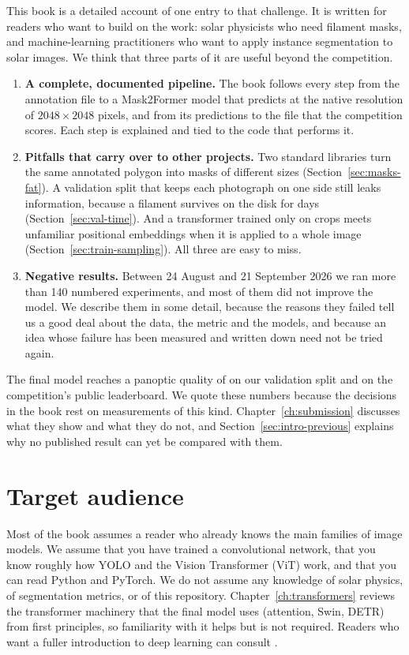 \documentclass[11pt,oneside]{book}
\begin{document}
This book is a detailed account of one entry to that challenge. It is written for readers who
want to build on the work: solar physicists who need filament masks, and machine-learning
practitioners who want to apply instance segmentation to solar images. We think that three parts
of it are useful beyond the competition.
\begin{enumerate}[leftmargin=*,itemsep=2pt]
\item \textbf{A complete, documented pipeline.} The book follows every step from the annotation
file to a Mask2Former model that predicts at the native resolution of $2048\times2048$ pixels, and
from its predictions to the file that the competition scores. Each step is explained and tied to
the code that performs it.
\item \textbf{Pitfalls that carry over to other projects.} Two standard libraries turn the same
annotated polygon into masks of different sizes (Section~\ref{sec:masks-fat}). A validation split
that keeps each photograph on one side still leaks information, because a filament survives on the
disk for days (Section~\ref{sec:val-time}). And a transformer trained only on crops meets
unfamiliar positional embeddings when it is applied to a whole image
(Section~\ref{sec:train-sampling}). All three are easy to miss.
\item \textbf{Negative results.} Between 24 August and 21 September 2026 we ran more than 140
numbered experiments, and most of them did not improve the model. We describe them in some detail,
because the reasons they failed tell us a good deal about the data, the metric and the models, and
because an idea whose failure has been measured and written down need not be tried again.
\end{enumerate}
The final model reaches a panoptic quality of \HostPQ{} on our validation split and \BestPublic{}
on the competition's public leaderboard. We quote these numbers because the decisions in the book
rest on measurements of this kind. Chapter~\ref{ch:submission} discusses what they show and what
they do not, and Section~\ref{sec:intro-previous} explains why no published result can yet be
compared with them.

\section*{Target audience}
Most of the book assumes a reader who already knows the main families of image models. We
assume that you have trained a convolutional network, that you know roughly how YOLO and the
Vision Transformer (ViT) work, and that you can read Python and PyTorch. We do not assume any
knowledge of solar physics, of segmentation metrics, or of this repository. Chapter~\ref{ch:transformers}
reviews the transformer machinery that the final model uses (attention, Swin, DETR) from first
principles, so familiarity with it helps but is not required. Readers who want a fuller
introduction to deep learning can consult \citet{bishop}.
\end{document}
